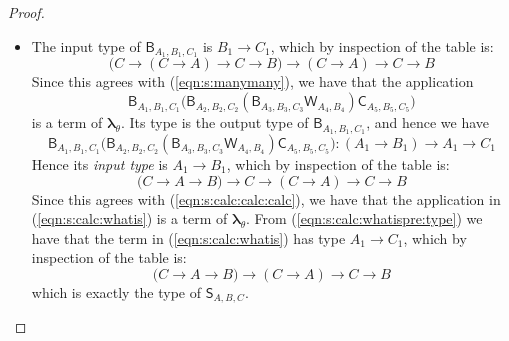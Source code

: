 \documentclass{lmcs} %
\newcommand{\param}{\theta}
\newcommand{\mltup}{\boldsymbol\lambda_{\param}}
\newcommand{\ctS}[6]{{\mathsf S}_{#1, #2, #3}#4#5#6}
\newcommand{\ctC}[6]{{\mathsf C}_{#1, #2, #3}#4#5#6}
\newcommand{\ctW}[4]{{\mathsf W}_{#1, #2}#3#4}
\newcommand{\ctB}[6]{{\mathsf B}_{#1, #2, #3}#4#5#6}
\begin{document}
\begin{proof}
\begin{proofdetail}
\begin{itemize}[leftmargin=*]
\begin{equation*}
(C\rightarrow (C\rightarrow A)\rightarrow C\rightarrow B)\rightarrow (C\rightarrow A)\rightarrow C\rightarrow C\rightarrow B
\end{equation*}
Since this agrees with~(\ref{eqn:s:inputb(bw)}), the application $\ctB{A_2}{B_2}{C_2}{}{}{} (\ctB{A_3}{B_3}{C_3}{}{}{} \ctW{A_4}{B_4}{}{}) \ctC{A_5}{B_5}{C_5}{}{}{}$ is a term of $\mltup$. Its type the output type of $\ctB{A_2}{B_2}{C_2}{}{}{} (\ctB{A_3}{B_3}{C_3}{}{}{} \ctW{A_4}{B_4}{}{})$, which is $A_2\rightarrow C_2$. By inspection of the table this is
\begin{equation}\label{eqn:s:manymany}
\big(C\rightarrow (C\rightarrow A)\rightarrow C\rightarrow B \big)\rightarrow (C\rightarrow A)\rightarrow C\rightarrow B
\end{equation}
\item The input type of $\ctB{A_1}{B_1}{C_1}{}{}{}$ is $B_1\rightarrow C_1$, which by inspection of the table is:
\begin{equation*}
\big(C\rightarrow (C\rightarrow A)\rightarrow C\rightarrow B \big)\rightarrow (C\rightarrow A)\rightarrow C\rightarrow B
\end{equation*}
Since this agrees with (\ref{eqn:s:manymany}), we have that the application
\begin{equation*}
\ctB{A_1}{B_1}{C_1}{}{}{} \big(\ctB{A_2}{B_2}{C_2}{}{}{} (\ctB{A_3}{B_3}{C_3}{}{}{} \ctW{A_4}{B_4}{}{}) \ctC{A_5}{B_5}{C_5}{}{}{}\big)
\end{equation*}
is a term of $\mltup$. Its type is the output type of $\ctB{A_1}{B_1}{C_1}{}{}{}$, and hence we have
\begin{equation}\label{eqn:s:calc:whatispre:type}
\ctB{A_1}{B_1}{C_1}{}{}{} \big(\ctB{A_2}{B_2}{C_2}{}{}{} (\ctB{A_3}{B_3}{C_3}{}{}{} \ctW{A_4}{B_4}{}{}) \ctC{A_5}{B_5}{C_5}{}{}{}\big) : (A_1\rightarrow B_1)\rightarrow A_1\rightarrow C_1
\end{equation}
Hence its \emph{input type} is $A_1\rightarrow B_1$, which by inspection of the table is:
\begin{equation*}
\big( C\rightarrow A\rightarrow B\big) \rightarrow C\rightarrow (C\rightarrow A)\rightarrow C\rightarrow B
\end{equation*}
Since this agrees with (\ref{eqn:s:calc:calc:calc}), we have that the application in (\ref{eqn:s:calc:whatis}) is a term of $\mltup$. From (\ref{eqn:s:calc:whatispre:type}) we have that the term in  (\ref{eqn:s:calc:whatis}) has type $A_1\rightarrow C_1$, which by inspection of the table is:
\begin{equation*}
\big( C\rightarrow A\rightarrow B\big) \rightarrow (C\rightarrow A)\rightarrow C\rightarrow B
\end{equation*}
which is exactly the type of $\ctS{A}{B}{C}{}{}{}$.




\end{itemize}
\end{proofdetail}
\end{proof}
\end{document}
